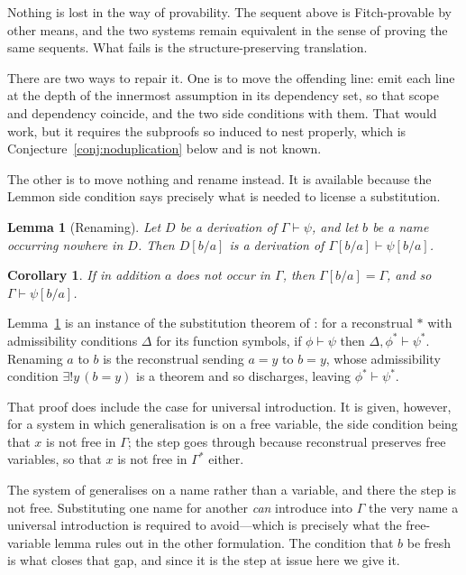 \documentclass[11pt]{article}
\theoremstyle{plain}
\newtheorem{corollary}[theorem]{Corollary}
\newtheorem{lemma}[theorem]{Lemma}
\theoremstyle{definition}
\theoremstyle{remark}
\begin{document}
Nothing is lost in the way of provability. The sequent above is Fitch-provable
by other means, and the two systems remain equivalent in the sense of proving
the same sequents. What fails is the structure-preserving translation.

There are two ways to repair it. One is to move the offending line: emit each
line at the depth of the innermost assumption in its dependency set, so that
scope and dependency coincide, and the two side conditions with them. That
would work, but it requires the subproofs so induced to nest properly, which
is Conjecture~\ref{conj:noduplication} below and is not known.

The other is to move nothing and rename instead. It is available because the
Lemmon side condition says precisely what is needed to license a substitution.

\begin{lemma}[Renaming]\label{lem:rename}
Let $D$ be a derivation of $\Gamma \vdash \psi$, and let $b$ be a name
occurring nowhere in $D$. Then $D[b/a]$ is a derivation of
$\Gamma[b/a] \vdash \psi[b/a]$.
\end{lemma}

\begin{corollary}\label{cor:rename}
If in addition $a$ does not occur in $\Gamma$, then $\Gamma[b/a] = \Gamma$,
and so $\Gamma \vdash \psi[b/a]$.
\end{corollary}

Lemma~\ref{lem:rename} is an instance of the substitution theorem
of \cite[Thm.~4.5.14]{halvorson2019}: for a reconstrual $*$ with admissibility
conditions $\Delta$ for its function symbols, if $\phi \vdash \psi$ then
$\Delta, \phi^* \vdash \psi^*$. Renaming $a$ to $b$ is the reconstrual sending
$a = y$ to $b = y$, whose admissibility condition $\exists ! y\,(b = y)$ is a
theorem and so discharges, leaving $\phi^* \vdash \psi^*$.

That proof does include the case for universal introduction. It is given,
however, for a system in which generalisation is on a free variable, the side
condition being that $x$ is not free in $\Gamma$; the step goes through
because reconstrual preserves free variables, so that $x$ is not free in
$\Gamma^*$ either.

The system of \cite{halvorson2020} generalises on a name rather than a
variable, and there the step is not free. Substituting one name for another
\emph{can} introduce into $\Gamma$ the very name a universal introduction is
required to avoid---which is precisely what the free-variable lemma rules out
in the other formulation. The condition that $b$ be fresh is what closes that
gap, and since it is the step at issue here we give it.
\end{document}
